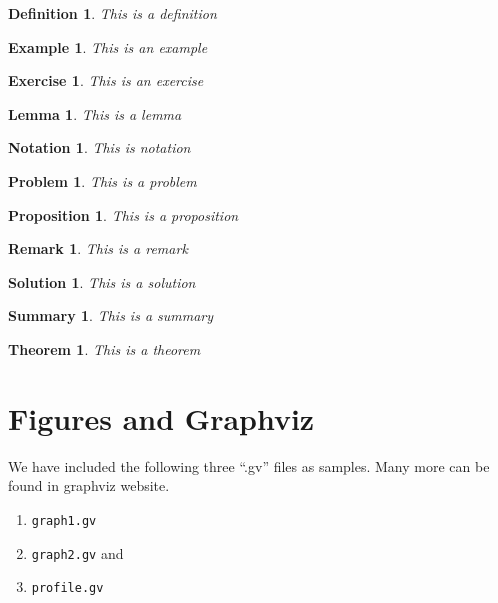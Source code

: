 \documentclass[11pt,a4paper]{amsart}
\newtheorem{theorem}{Theorem}
\theoremstyle{plain}
\newtheorem{definition}{Definition}
\newtheorem{example}{Example}
\newtheorem{exercise}{Exercise}
\newtheorem{lemma}{Lemma}
\newtheorem{notation}{Notation}
\newtheorem{problem}{Problem}
\newtheorem{proposition}{Proposition}
\newtheorem{remark}{Remark}
\newtheorem{solution}{Solution}
\newtheorem{summary}{Summary}
\numberwithin{equation}{section}
\theoremstyle{definition}
\begin{document}
\begin{definition}
This is a definition
\end{definition}

\begin{example}
This is an example
\end{example}

\begin{exercise}
This is an exercise
\end{exercise}

\begin{lemma}
This is a lemma
\end{lemma}


\begin{notation}
This is notation
\end{notation}

\begin{problem}
This is a problem
\end{problem}

\begin{proposition}
This is a proposition
\end{proposition}

\begin{remark}
This is a remark
\end{remark}

\begin{solution}
This is a solution
\end{solution}

\begin{summary}
This is a summary
\end{summary}

\begin{theorem}
This is a theorem
\end{theorem}



\section{Figures and Graphviz}

We have included the following three ``.gv'' files as samples. Many more can be found in graphviz website.
\begin{enumerate}
	\item {\tt graph1.gv}
	\item {\tt graph2.gv} and
	\item {\tt profile.gv}
\end{enumerate}
\end{document}
